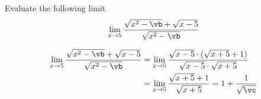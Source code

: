 


\SQUARE\va\vb
\MULTIPLY{}\vc

\question[1] Evaluate the following limit \[ \lim_{x\to\va}\dfrac{\sqrt{x^2 -\vb} + \sqrt{x-\va}}{\sqrt{x^2-\vb}}\]

\watchout

\begin{solution}[\mcq]
  \begin{align}
    \lim_{x\to\va}\dfrac{\sqrt{x^2-\vb} + \sqrt{x-\va}}{\sqrt{x^2-\vb}} &= 
    \lim_{x\to\va}\dfrac{\sqrt{x-\va}\cdot (\sqrt{x+\va} + 1)}{\sqrt{x-\va}\cdot\sqrt{x + \va}} \\
    &= \lim_{x\to\va}\dfrac{\sqrt{x+\va} + 1}{\sqrt{x + \va}} 
    = 1 + \frac{1}{\sqrt\vc}
  \end{align}
\end{solution}

\ifprintanswers\begin{codex}\end{codex}\fi
